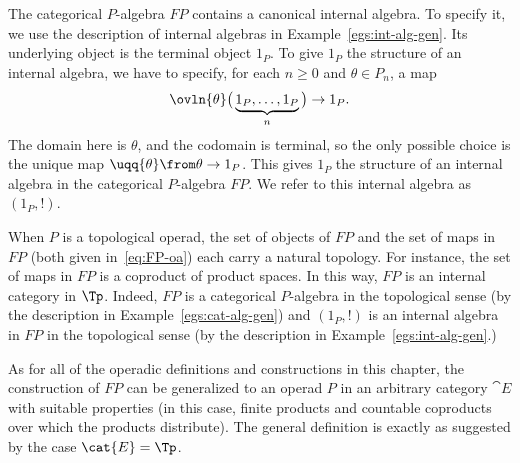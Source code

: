 The categorical $P$-algebra $FP$ contains a canonical internal algebra.  To
specify it, we use the description of internal algebras in
Example~\ref{egs:int-alg-gen}.  Its underlying
object is the terminal object $1_P$.  To give $1_P$ the structure of an
internal algebra, we have to specify, for each $n \geq 0$ and $\theta \in
P_n$, a map
\[
\ovln{\theta}
\bigl(\,
\underbrace{1_P, \ldots, 1_P}_n
\,\bigr)
\to 
1_P.
\]
The domain here is $\theta$, and the codomain is terminal, so the only
possible choice is the unique map $\uqq{\theta} \from \theta \to 1_P$.
This gives $1_P$ the structure of an internal algebra in the categorical
$P$-algebra $FP$.  We refer to this internal algebra as $(1_P, !)$.

When $P$ is a topological operad, the set of objects of $FP$ and the set of
maps in $FP$ (both given in~\eqref{eq:FP-oa}) each carry a natural
topology.  For instance, the set of maps in $FP$ is a coproduct of product
spaces.  In this way, $FP$ is an internal category in $\Tp$.
Indeed, $FP$ is a categorical $P$-algebra in the topological sense (by the
description in Example~\ref{egs:cat-alg-gen}) and
$(1_P, !)$ is an internal algebra in $FP$ in the topological sense (by the
description in Example~\ref{egs:int-alg-gen}.)

\begin{remark}
As for all of the operadic definitions and constructions in this chapter,
the construction of $FP$ can be generalized to an operad $P$ in an
arbitrary category $\cat{E}$ with suitable properties (in this case, finite
products and countable coproducts over which the products distribute).  The
general definition is exactly as suggested by the case $\cat{E} = \Tp$.
\end{remark}

